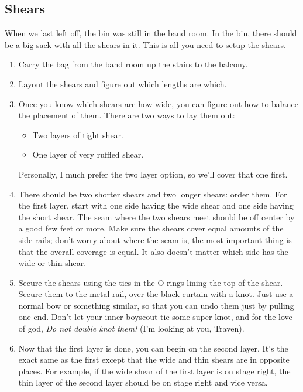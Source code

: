 \documentclass[letterpaper,10pt,oneside,headsepline]{scrreprt}
\begin{document}
\subsection{Shears}
When we last left off, the bin was still in the band room. In the bin, there should be a big sack with all the shears in it. This is all you need to setup the shears.
\begin{enumerate}
\item Carry the bag from the band room up the stairs to the balcony.
\item Layout the shears and figure out which lengths are which.
\item Once you know which shears are how wide, you can figure out how to balance the placement of them. There are two ways to lay them out: 
\begin{itemize}
\item Two layers of tight shear.
\item One layer of very ruffled shear. 
\end{itemize}

Personally, I much prefer the two layer option, so we'll cover that one first. 

\item There should be two shorter shears and two longer shears: order them. For the first layer, start with one side having the wide shear and one side having the short shear. The seam where the two shears meet should be off center by a good few feet or more. Make sure the shears cover equal amounts of the side rails; don't worry about where the seam is, the most important thing is that the overall coverage is equal. It also doesn't matter which side has the wide or thin shear.
\item Secure the shears using the ties in the O-rings lining the top of the shear. Secure them to the metal rail, over the black curtain with a knot. Just use a normal bow or something similar, so that you can undo them just by pulling one end. Don't let your inner boyscout tie some super knot, and for the love of god, \textit{Do not double knot them!} (I'm looking at you, Traven).
\item Now that the first layer is done, you can begin on the second layer. It's the exact same as the first except that the wide and thin shears are in opposite places. For example, if the wide shear of the first layer is on stage right, the thin layer of the second layer should be on stage right and vice versa.
\end{enumerate}
\end{document}
